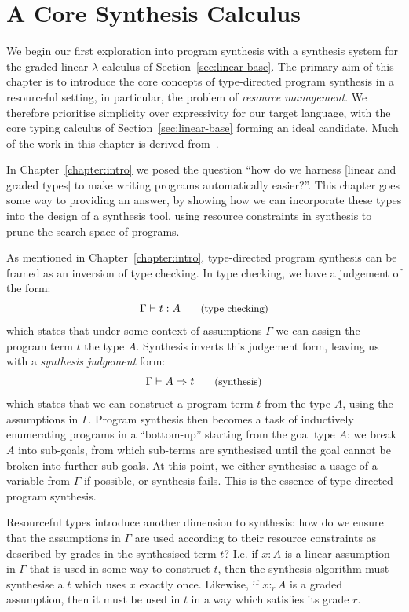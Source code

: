\chapter{A Core Synthesis Calculus}
\label{chapter:core}
We begin our first exploration into program synthesis with a synthesis system for the
graded linear $\lambda$-calculus of Section~\ref{sec:linear-base}. %
The primary aim of this chapter is to introduce the core concepts of
type-directed program synthesis in a resourceful setting, in particular, the
problem of \textit{resource management}. We therefore prioritise simplicity over
expressivity for our target language, with the core typing calculus of
Section~\ref{sec:linear-base} forming an ideal candidate. Much of the work in
this chapter is derived from~\citet{DBLP:conf/lopstr/HughesO20}. 

In Chapter~\ref{chapter:intro} we posed the question ``how do we harness [linear
and graded types] to make writing programs automatically easier?''. This chapter
goes some way to providing an answer, by showing how we can  
incorporate these types into the design of a synthesis tool, using resource
constraints in synthesis to prune the search space of programs. 

As mentioned in Chapter~\ref{chapter:intro}, type-directed program synthesis can
be framed as an inversion of type checking. In type checking, we have a
judgement of the form: 
\begin{align*}
    \Gamma \vdash t : A {\small{\tag{type checking}}}
\end{align*}
which states that under some context of assumptions $\Gamma$ we can assign the
program term $t$ the type $A$. Synthesis inverts this judgement form, leaving us
with a \textit{synthesis judgement} form:
\begin{align*}
    \Gamma \vdash A \Rightarrow t {\small{\tag{synthesis}}}
\end{align*}
which states that we can construct a program term $t$ from the type $A$, using
the assumptions in $\Gamma$. Program synthesis then becomes a task of
inductively enumerating programs in a ``bottom-up'' starting from the goal type
$A$: we break $A$ into sub-goals, from which sub-terms are synthesised until the
goal cannot be broken into further sub-goals. At this point, we either
synthesise a usage of a variable from $\Gamma$ if possible, or synthesis fails.
This is the essence of type-directed program synthesis. 

Resourceful types introduce another dimension to synthesis: how do we ensure
that the assumptions in $\Gamma$ are used according to their resource
constraints as described by grades in the synthesised term $t$? I.e. if $x : A$
is a linear assumption in $\Gamma$ that is used in some way to construct $t$,
then the synthesis algorithm must synthesise a $t$ which uses $x$ exactly once.
Likewise, if $x :_r A$ is a graded assumption, then it must be used in $t$ in a
way which satisfies its grade $r$.

